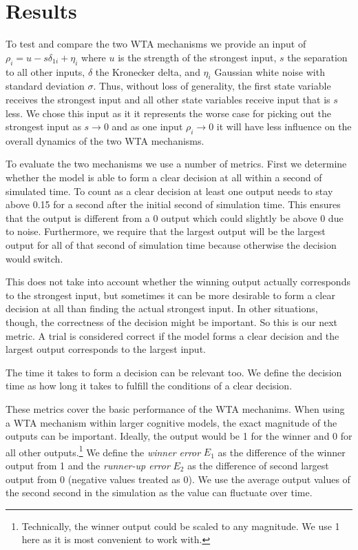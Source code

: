 \documentclass[10pt,letterpaper]{article}
\begin{document}
\section{Results}\label{sec:results}
To test and compare the two WTA mechanisms we provide an input of $\rho_i 
= u - s \delta_{1i} + \eta_i$ where $u$ is the strength of the strongest input, 
$s$ the separation to all other inputs, $\delta$ the Kronecker delta, and 
$\eta_i$ Gaussian white noise with standard deviation $\sigma$. Thus, without 
loss of generality, the first state variable receives the strongest input and 
all other state variables receive input that is $s$ less. We chose this input as 
it it represents the worse case for picking out the strongest input as $s 
\rightarrow 0$ and as one input $\rho_i \rightarrow 0$ it will have less 
influence on the overall dynamics of the two WTA mechanisms.

To evaluate the two mechanisms we use a number of metrics. First we determine 
whether the model is able to form a clear decision at all within a second of 
simulated time. To count as a clear decision at least one output needs to stay 
above 0.15 for a second after the initial second of simulation time. This 
ensures that the output is different from a 0 output which could slightly be 
above 
0 due to noise. Furthermore, we require that the largest output will be the 
  largest output for all of that second of simulation time because otherwise the 
  decision would switch.

This does not take into account whether the winning output actually corresponds 
to the strongest input, but sometimes it can be more desirable to form a clear 
decision at all than finding the actual strongest input. In other situations, 
though, the correctness of the decision might be important. So this is our next 
metric. A trial is considered correct if the model forms a clear decision and 
the largest output corresponds to the largest input.

The time it takes to form a decision can be relevant too. We define the decision 
time as how long it takes to fulfill the conditions of a clear decision.

These metrics cover the basic performance of the WTA mechanims. When using a WTA 
mechanism within larger cognitive models, the exact magnitude of the outputs can 
be important. Ideally, the output would be 1 for the winner and 0 for all other 
outputs.\footnote{Technically, the winner output could be scaled to any 
    magnitude. We use 1 here as it is most convenient to work with.} We define 
the \emph{winner error} $E_1$ as the difference of the winner output from 1 and 
the \emph{runner-up error} $E_2$ as the difference of second largest output from 
0 (negative values treated as 0). We use the average output values of the second 
  second in the simulation as the value can fluctuate over time.
\end{document}

